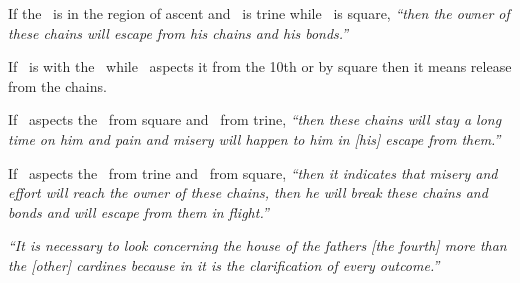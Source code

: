 If the \Moon\, is in the region of ascent and \Mars\, is trine while \Jupiter\, is square, \textsl{``then the owner of these chains will escape from his chains and his bonds.''}

If \Saturn\, is with the \Moon\, while \Jupiter\, aspects it from the 10th or by square then it means release from the chains.

If \Mars\, aspects the \Moon\, from square and \Saturn\, from trine, \textsl{``then these chains will stay a long time on  him and pain and misery will happen to him in [his] escape from them.''}

If \Mars\, aspects the \Moon\, from trine and \Saturn\, from square, \textsl{``then it indicates that misery and effort will reach the owner of these chains, then he will break these chains and bonds and will escape from them in flight.''}

\textsl{``It is necessary to look concerning the house of the fathers [the fourth] more than the [other] cardines because in it is the clarification of every outcome.''}





